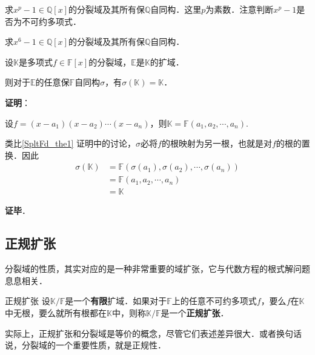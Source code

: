 \begin{exercise}{}
求$x^p-1\in\mathbb{Q}[x]$的分裂域及其所有保$\mathbb{Q}$自同构．这里$p$为素数．注意判断$x^p-1$是否为不可约多项式．
\end{exercise}


\begin{exercise}{}
求$x^6-1\in\mathbb{Q}[x]$的分裂域及其所有保$\mathbb{Q}$自同构．
\end{exercise}


\begin{corollary}{}\label{SpltFd_cor1}
设$\mathbb{K}$是多项式$f\in\mathbb{F}[x]$的分裂域，$\mathbb{E}$是$\mathbb{K}$的扩域．

则对于$\mathbb{E}$的任意保$\mathbb{F}$自同构$\sigma$，有$\sigma(\mathbb{K})=\mathbb{K}$．
\end{corollary}

\textbf{证明}：

设$f=(x-a_1)(x-a_2)\cdots(x-a_n)$，则$\mathbb{K}=\mathbb{F}(a_1, a_2, \cdots, a_n)$.

类比\autoref{SpltFd_the1} 证明中的讨论，$\sigma$必将$f$的根映射为另一根，也就是对$f$的根的置换．因此
\begin{equation}
\begin{aligned}
\sigma(\mathbb{K})&=\mathbb{F}(\sigma(a_1), \sigma(a_2), \cdots, \sigma(a_n))\\
&=\mathbb{F}(a_1, a_2, \cdots, a_n)\\
&=\mathbb{K}
\end{aligned}
\end{equation}

\textbf{证毕}．





\subsection{正规扩张}

分裂域的性质，其实对应的是一种非常重要的域扩张，它与代数方程的根式解问题息息相关．

\begin{definition}{正规扩张}
设$\mathbb{K}/\mathbb{F}$是一个\textbf{有限}扩域．如果对于$\mathbb{F}$上的任意不可约多项式$f$，要么$f$在$\mathbb{K}$中无根，要么就所有根都在$\mathbb{K}$中，则称$\mathbb{K}/\mathbb{F}$是一个\textbf{正规扩张}．
\end{definition}

实际上，正规扩张和分裂域是等价的概念，尽管它们表述差异很大．或者换句话说，分裂域的一个重要性质，就是正规性．


